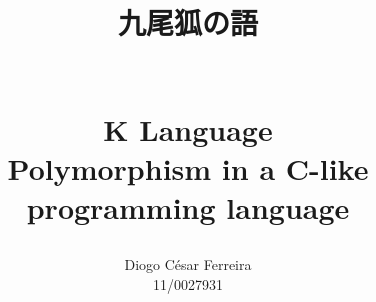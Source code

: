\documentclass[12pt]{article}
\begin{document}

\title{\small\begin{CJK}{UTF8}{min}九\hspace{0.55cm}尾\hspace{0.55cm}狐\hspace{0.55cm}の\hspace{0.55cm}語\end{CJK}\\\huge K Language\\\normalsize Polymorphism in a C-like \\ programming language}
\author{Diogo César Ferreira\\11/0027931}

\maketitle


 
 
 
 
 
\clearpage









\printbibliography
\end{document}
